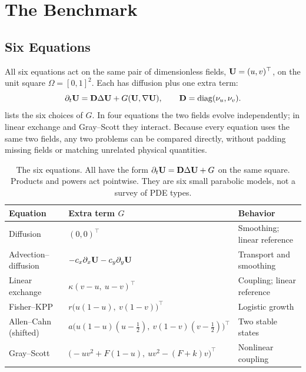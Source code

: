 \section{The Benchmark}
\label{sec:benchmark}
\subsection{Six Equations}
All six equations act on the same pair of dimensionless fields, $\mathbf U=(u,v)^\top$, on the unit square $\Omega=[0,1]^2$. Each has diffusion plus one extra term:
\begin{equation}
 \partial_t\mathbf U=\mathbf D\Delta\mathbf U+G(\mathbf U,\nabla\mathbf U),
 \qquad \mathbf D=\operatorname{diag}(\nu_u,\nu_v).
\label{eq:common-pde}
\end{equation}
 lists the six choices of $G$. In four equations the two fields evolve independently; in linear exchange and Gray--Scott they interact. Because every equation uses the same two fields, any two problems can be compared directly, without padding missing fields or matching unrelated physical quantities.

\begin{table}[t]
\centering
\caption{The six equations. All have the form $\partial_t\mathbf U=\mathbf D\Delta\mathbf U+G$ on the same square. Products and powers act pointwise. They are six small parabolic models, not a survey of PDE types.}
\label{tab:equations}
\small
\begin{tabular}{p{}p{}p{}}
\toprule
Equation & Extra term $G$ & Behavior \\
\midrule
Diffusion & $(0,0)^\top$ & Smoothing; linear reference \\
Advection--diffusion & $-c_x\partial_x\mathbf U-c_y\partial_y\mathbf U$ & Transport and smoothing \\
Linear exchange & $\kappa(v-u,\ u-v)^\top$ & Coupling; linear reference \\
Fisher--KPP & $r\big(u(1-u),\ v(1-v)\big)^\top$ & Logistic growth \\
Allen--Cahn (shifted) & $a\big(u(1-u)(u-\tfrac12),\ v(1-v)(v-\tfrac12)\big)^\top$ & Two stable states \\
Gray--Scott & $\big(-uv^2+F(1-u),\ uv^2-(F+k)v\big)^\top$ & Nonlinear coupling \\
\bottomrule
\end{tabular}
\end{table}


